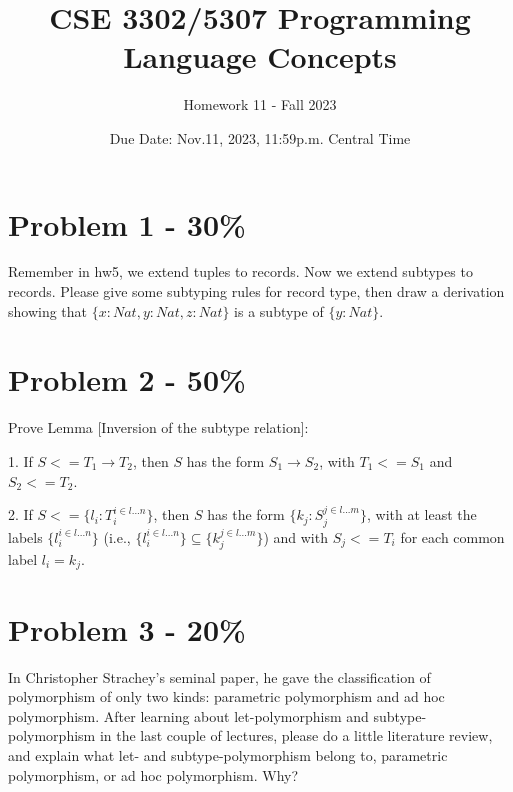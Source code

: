 \documentclass{article}
\begin{document}
\title{CSE 3302/5307 Programming Language Concepts}
\author{Homework 11 - Fall 2023}
\date{Due Date: Nov.11, 2023, 11:59p.m. Central Time}
\maketitle
\thispagestyle{fancy}


\section*{Problem 1 - 30\%}

Remember in hw5, we extend tuples to records. Now we extend subtypes to records. Please give some subtyping rules for record type, then draw a derivation showing that $\{x:Nat, y:Nat, z:Nat\}$ is a subtype of $\{y:Nat\}$.



\section*{Problem 2 - 50\%}

Prove Lemma [Inversion of the subtype relation]:
	
	1. If $S <= T_1 \rightarrow T_2$, then $S$ has the form $S_1 \rightarrow S_2$, with $T_1 <= S_1$ and $S_2 <= T_2$.
	
	2. If $S <= \{l_i:T_i^{i \in l...n}\}$, then $S$ has the form $\{k_j:S_j^{j \in l...m}\}$, with at least the labels $\{l_i^{i \in l...n}\}$ (i.e., $\{l_i^{i \in l...n}\} \subseteq \{k_j^{j \in l...m}\}$) and with $S_j <= T_i$ for each common label $l_i=k_j$.

\section*{Problem 3 - 20\%}
In Christopher Strachey's seminal paper\cite{strachey2000}, he gave the classification of polymorphism of only two kinds: parametric polymorphism and ad hoc
polymorphism. After learning about let-polymorphism and subtype-polymorphism
in the last couple of lectures, please do a little literature review, and explain what let- and subtype-polymorphism belong to, parametric polymorphism, or
ad hoc polymorphism. Why?


\end{document}
